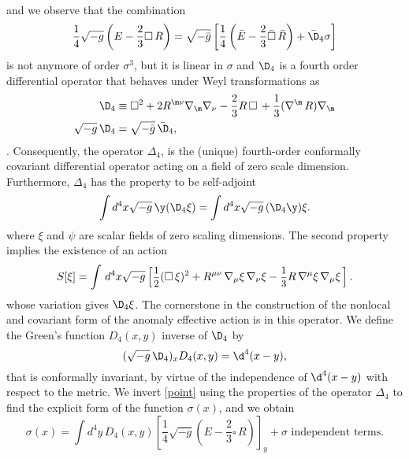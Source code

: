 \documentclass[a4paper,11pt,openright,twoside]{book}
\let\n=\nu      \let\x=\xi     \let\p=\pi      \let\r=\rho
\let\s=\sigma  \let\t=\tau     \let\u=\upsilon \let\f=\phi
\newcommand{\sdfrac}[2]{\mbox{\small$\displaystyle\frac{#1}{#2}$}}
\numberwithin{equation}{section}
\begin{document}
{{{{\begin{align}
	\end{align}
	and we observe that the combination 
	\begin{equation}
		\frac{1}{4}\sqrt{-g}\left(E-\frac{2}{3}\square\, R\right)=\sqrt{-\bar g}\left[\frac{1}{4}\left(\bar E-\frac{2}{3}\bar\square\, \bar R\right)+\bar\D_4\s\right]\label{point}
	\end{equation}
	is not anymore of order $\sigma^3$, but it is linear in $\sigma$ and $\D_4$ is a fourth order differential operator that behaves under Weyl transformations as 
	\begin{align}
		\D_4&\equiv \square^2+2 R^{\m\n}\nabla_\m\nabla_\n-\frac{2}{3}R\,\square\,+\frac{1}{3}(\nabla^\m\,R)\nabla_\m\\
		\sqrt{-g}\,\D_4&=\sqrt{-\bar g}\,\bar{\D}_4,\label{point2}
	\end{align}
	\cite{Riegert:1987kt,Antoniadis:1992xu,Antoniadis:1991fa,Mazur:2001aa}. Consequently, the operator $\Delta_4$, is the (unique) fourth-order conformally covariant differential operator acting on a field of zero scale dimension. Furthermore, $\Delta_4$ has the property to be self-adjoint 
	\begin{equation}
		\int d^4x\sqrt{-g}\,\y(\D_4\x)=\int d^4x\sqrt{-g}\,(\D_4\y)\x.\label{point3}
	\end{equation}
	where $\x$ and $\psi$ are scalar fields of zero scaling dimensions. The second property implies the existence of an action  
	\begin{equation}
		S[\xi]=\int\,d^4x\sqrt{-g}\left[\sdfrac{1}{2}(\square\,\xi)^2+R^{\mu\nu}\,\nabla_\mu\xi\,\nabla_\nu\xi-\sdfrac{1}{3}R\,\nabla^\mu\xi\,\nabla_\mu\xi\,\right].
	\end{equation}
	whose variation gives $\D_4\xi$. The cornerstone in the construction of the nonlocal and covariant form of the anomaly effective action is in this operator. We define the Green's function $D_4(x,y)$ inverse of $\D_4$ by
	\begin{equation}
		(\sqrt{-g}\,\D_4)_xD_4(x,y)=\d^4(x-y),\label{point4}
	\end{equation}
	that is conformally invariant, by virtue of the independence of $\d^4(x-y)$ with respect to the metric. We invert \eqref{point} using the properties of the operator $\Delta_4$ to find the explicit form of the function $\sigma(x)$, and we obtain
	\begin{equation}
		\s(x)=\int d^4y\,D_4(x,y)\left[\frac{1}{4}\sqrt{-g}\left(E-\frac{2}{3}\square\, R\right)\right]_y+\text{$\s$ independent terms}.
	\end{equation}
}}}}
\end{document}
